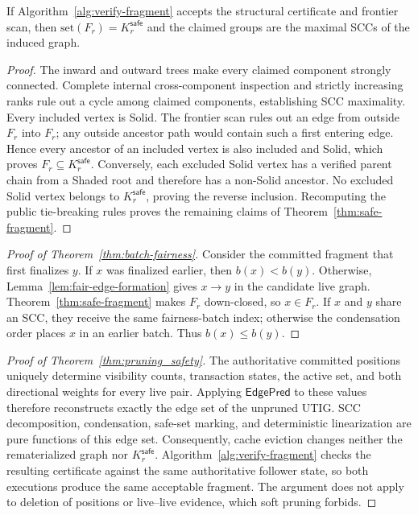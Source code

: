 \begin{lemma}
\label{lem:safe-closure-certificate}
If Algorithm~\ref{alg:verify-fragment} accepts the structural certificate and
frontier scan, then $\mathrm{set}(F_r)=K_r^{\mathsf{safe}}$ and the claimed
groups are the maximal SCCs of the induced graph.
\end{lemma}

\begin{proof}
The inward and outward trees make every claimed component strongly connected.
Complete internal cross-component inspection and strictly increasing ranks
rule out a cycle among claimed components, establishing SCC maximality.  Every
included vertex is Solid.  The frontier scan rules out an edge from outside
$F_r$ into $F_r$; any outside ancestor path would contain such a first entering
edge.  Hence every ancestor of an included vertex is also included and Solid,
which proves $F_r\subseteq K_r^{\mathsf{safe}}$.  Conversely, each excluded
Solid vertex has a verified parent chain from a Shaded root and therefore has
a non-Solid ancestor.  No excluded Solid vertex belongs to
$K_r^{\mathsf{safe}}$, proving the reverse inclusion.  Recomputing the public
tie-breaking rules proves the remaining claims of
Theorem~\ref{thm:safe-fragment}.
\end{proof}

\begin{proof}[Proof of Theorem~\ref{thm:batch-fairness}]
Consider the committed fragment that first finalizes $y$.  If $x$ was
finalized earlier, then $b(x)<b(y)$.  Otherwise,
Lemma~\ref{lem:fair-edge-formation} gives $x\to y$ in the candidate live
graph.  Theorem~\ref{thm:safe-fragment} makes $F_r$ down-closed, so
$x\in F_r$.  If $x$ and $y$ share an SCC, they receive the same fairness-batch
index; otherwise the condensation order places $x$ in an earlier batch.
Thus $b(x)\le b(y)$.
\end{proof}

\begin{proof}[Proof of Theorem~\ref{thm:pruning_safety}]
The authoritative committed positions uniquely determine visibility counts,
transaction states, the active set, and both directional weights for every
live pair.  Applying $\mathsf{EdgePred}$ to these values therefore reconstructs
exactly the edge set of the unpruned UTIG.  SCC decomposition, condensation,
safe-set marking, and deterministic linearization are pure functions of this
edge set.  Consequently, cache eviction changes neither the rematerialized
graph nor $K_r^{\mathsf{safe}}$.  Algorithm~\ref{alg:verify-fragment} checks the
resulting certificate against the same authoritative follower state, so both
executions produce the same acceptable fragment.  The argument does not apply
to deletion of positions or live--live evidence, which soft pruning forbids.
\end{proof}

